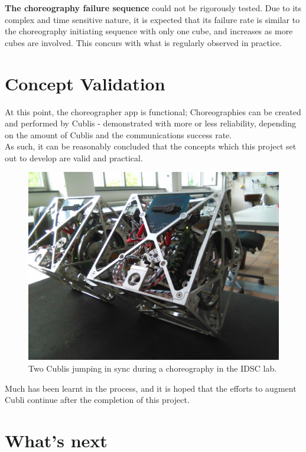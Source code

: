 \textbf{The choreography failure sequence} could not be rigorously tested. Due to its complex and time sensitive nature, it is expected that its failure rate is similar to the choreography initiating sequence with only one cube, and increases as more cubes are involved. This concurs with what is regularly observed in practice.

\section{Concept Validation}

At this point, the choreographer app is functional; Choreographies can be created and performed by Cublis - demonstrated with more or less reliability, depending on the amount of Cublis and the communications success rate.\\

As such, it can be reasonably concluded that the concepts which this project set out to develop are valid and practical.    

\begin{figure}[H]
   \centering
   \includegraphics[width=1\textwidth]{img/Performing.jpg}
   \caption{Two Cublis jumping in sync during a choreography in the IDSC lab.}
   \label{img:performing}
\end{figure}

Much has been learnt in the process, and it is hoped that the efforts to augment Cubli continue after the completion of this project.

\section{What's next}

